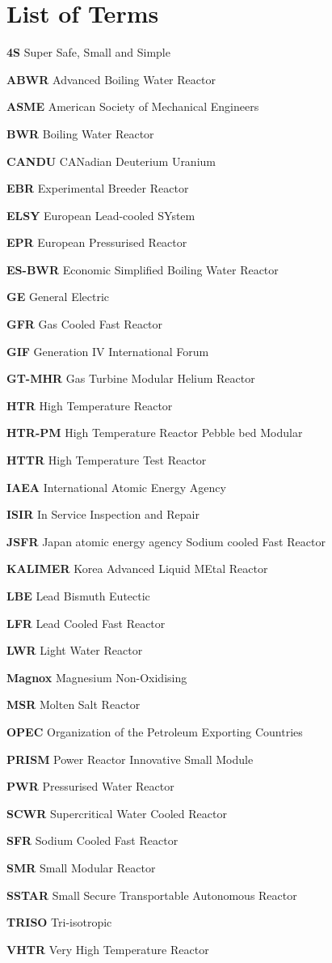 \documentclass[journal]{IEEEtran}
\begin{document}
\section{List of Terms}
\footnotesize
\scriptsize
\textbf{4S} Super Safe, Small and Simple \par
\textbf{ABWR} Advanced Boiling Water Reactor\par
\textbf{ASME} American Society of Mechanical Engineers\par
\textbf{BWR} Boiling Water Reactor\par
\textbf{CANDU} CANadian Deuterium Uranium\par
\textbf{EBR} Experimental Breeder Reactor\par
\textbf{ELSY} European Lead-cooled SYstem\par
\textbf{EPR} European Pressurised Reactor\par
\textbf{ES-BWR} Economic Simplified Boiling Water Reactor\par
\textbf{GE} General Electric\par
\textbf{GFR} Gas Cooled Fast Reactor\par
\textbf{GIF} Generation IV International Forum\par
\textbf{GT-MHR} Gas Turbine Modular Helium Reactor\par
\textbf{HTR} High Temperature Reactor\par
\textbf{HTR-PM} High Temperature Reactor Pebble bed Modular\par
\textbf{HTTR} High Temperature Test Reactor\par
\textbf{IAEA} International Atomic Energy Agency\par
\textbf{ISIR} In Service Inspection and Repair\par
\textbf{JSFR} Japan atomic energy agency Sodium cooled Fast Reactor\par
\textbf{KALIMER} Korea Advanced Liquid MEtal Reactor\par
\textbf{LBE} Lead Bismuth Eutectic\par
\textbf{LFR} Lead Cooled Fast Reactor\par
\textbf{LWR} Light Water Reactor\par
\textbf{Magnox} Magnesium Non-Oxidising\par
\textbf{MSR} Molten Salt Reactor\par
\textbf{OPEC} Organization of the Petroleum Exporting Countries\par
\textbf{PRISM} Power Reactor Innovative Small Module\par
\textbf{PWR} Pressurised Water Reactor\par
\textbf{SCWR} Supercritical Water Cooled Reactor\par
\textbf{SFR} Sodium Cooled Fast Reactor\par
\textbf{SMR} Small Modular Reactor\par
\textbf{SSTAR} Small Secure Transportable Autonomous Reactor\par
\textbf{TRISO} Tri-isotropic\par
\textbf{VHTR} Very High Temperature Reactor\par
\end{document}
